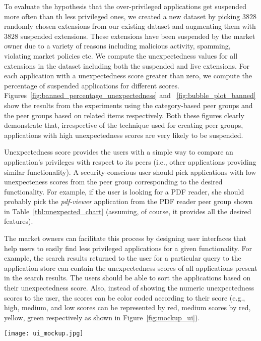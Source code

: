 To evaluate the hypothesis that the over-privileged applications get suspended more often than th less 
privileged ones, we created a new dataset by picking $3828$ randomly chosen extensions from 
our existing \ChromeMarket{} dataset and augmenting them with  $3828$ suspended extensions. These 
extensions have been suspended by the market owner due to a variety of reasons including malicious 
activity, spamming, violating market policies etc.  We compute the unexpectedness values for all extensions 
in the dataset including both the suspended and live extensions. For each 
application with a unexpectedness score greater than zero, we compute the percentage of suspended applications 
for different scores. Figures~\ref{fig:banned_percentage_unexpectedness} and ~\ref{fig:bubble_plot_banned} 
show the results  from the experiments using the category-based peer groups and the peer groups based on 
related items respectively. Both these figures clearly demonstrate that, irrespective of the
technique used for creating peer groups, applications with high unexpectedness scores are very 
likely to be suspended. 


Unexpectedness score provides the users with a simple way to compare an application's privileges 
with respect to its peers (i.e., other applications providing similar functionality). A security-conscious 
user should pick applications with low unexpecteness scores from the peer group corresponding to the 
desired functionality. For example, if the user is looking for a PDF reader, she should probably pick 
the {\it pdf-viewer} application from the PDF reader peer group shown in Table~\ref{tbl:unexpected_chart}
(assuming, of course, it provides all the desired features).

The market owners can facilitate this process by designing user interfaces that help users to 
easily find less privileged applications for a given functionality. For example, the search results 
returned to the user for a particular query to the application store can contain the unexpectedness 
scores of all applications present in the search results. The users should be able to 
sort the applications based on their unexpectedness score. Also, instead of showing 
the numeric unexpectedness scores to the user, the scores can be color coded 
according to their score (e.g., high, medium, and low scores can be represented by red, 
medium scores by red, yellow, green respectively as shown in Figure~\ref{fig:mockup_ui}).    

\begin{figure*}[!tbp]
\centering
\texttt{[image: ui\_mockup.jpg]}
\caption{A sample interface for displaying color-coded unexpectedness scores of each application 
present in the search results.} 
\label{fig:mockup_ui}
\end{figure*}

